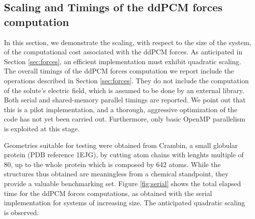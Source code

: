 % 





\subsection{Scaling and Timings of the ddPCM forces computation}
In this section, we demonstrate the scaling, with respect to the size of the system, of the computational cost associated with the ddPCM forces. As anticipated in Section \ref{sec:forces}, an efficient implementation must exhibit quadratic scaling. The overall timings of the ddPCM forces computation we report include the operations described in Section \ref{sec:forces}. They do not include the computation of the solute's electric field, which is assumed to be done by an external library. Both serial and shared-memory parallel timings are reported. We point out that this is a pilot implementation, and a thorough, aggressive optimization of the code has not yet been carried out. Furthermore, only basic OpenMP parallelism is exploited at this stage.

Geometries suitable for testing were obtained from Crambin, a small globular protein (PDB reference 1EJG), by cutting atom chains with lenghts multiple of 80, up to the whole protein which is composed by 642 atoms. While the structures thus obtained are meaningless from a chemical standpoint, they provide a valuable benchmarking set. Figure \ref{fig:serial} shows the total elapsed time for the ddPCM forces computations, as obtained with the serial implementation for systems of increasing size. The anticipated quadratic scaling is observed.

